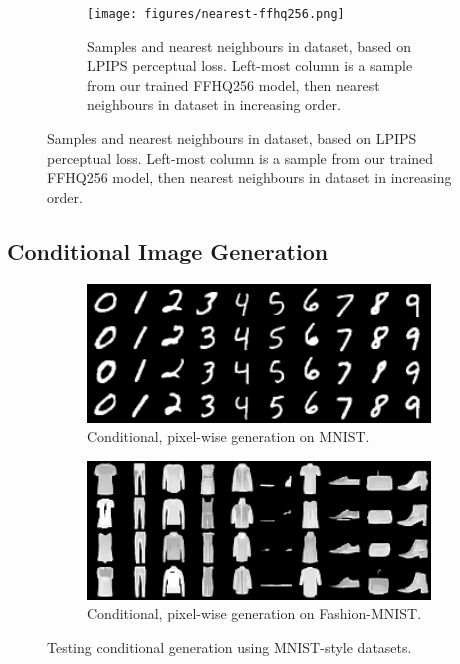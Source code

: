 \begin{figure}[ht]
    \centering
    \begin{subfigure}[b]{\textwidth}
        \centering
        \texttt{[image: figures/nearest-ffhq256.png]}
        \caption{
            Samples and nearest neighbours in dataset, based on LPIPS perceptual
            loss. Left-most column is a sample from our trained FFHQ256 model,
            then nearest neighbours in dataset in increasing order.
        }
    \end{subfigure}
\end{figure}

\subsection{Conditional Image Generation}

\begin{figure}[ht]
    \centering
    \begin{subfigure}[b]{0.47\textwidth}
        \centering
        \includegraphics[width=1.0\textwidth]{figures/mnist-samples.png}
        \caption{
            Conditional, pixel-wise generation on MNIST.
        }
    \end{subfigure}
    \hfill
    \begin{subfigure}[b]{0.47\textwidth}
        \centering
        \includegraphics[width=1.0\textwidth]{figures/fashionmnist-samples.png}
        \caption{
            Conditional, pixel-wise generation on Fashion-MNIST.
        }
    \end{subfigure}
    \caption{Testing conditional generation using MNIST-style datasets.}
    \label{fig:mnist}
\end{figure}

